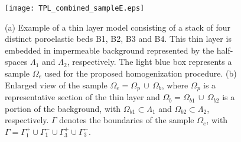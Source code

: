 \documentclass[draft]{agujournal2019}
\begin{document}
\begin{figure}[!ht]
\centering
        \texttt{[image: TPL\_combined\_sampleE.eps]}
\caption{ (a) Example of a thin layer model consisting of a stack of four distinct poroelastic beds B1, B2, B3 and B4. This thin layer is embedded in impermeable background represented by the half-spaces $\Lambda_1$ and $\Lambda_2$, respectively. The light blue box represents a sample $\Omega_e$ used for the proposed homogenization procedure. (b) Enlarged view of the sample $\Omega_e = \Omega_p \, \cup \, \Omega_b$, where  $\Omega_p$ is a representative section of the thin layer and  $\Omega_b= \Omega_{b1}  \, \cup \, \Omega_{b2}$ is a portion of the background, with $\Omega_{b1} \subset \Lambda_1$ and $\Omega_{b2} \subset \Lambda_2$, respectively. $\Gamma$ denotes the boundaries of the  sample $\Omega_e$, with  $\Gamma = \Gamma_1^+ \cup \Gamma_1^- \cup \Gamma_3^+ \cup \Gamma_3^-$.
}
\label{fig.1}
\end{figure}
\end{document}
